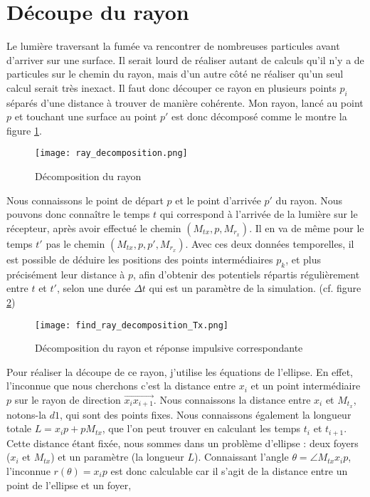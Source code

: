 \section{Découpe du rayon}

Le lumière traversant la fumée va rencontrer de nombreuses particules avant d'arriver sur une surface. Il serait lourd de réaliser autant de calculs qu'il n'y a de particules sur le chemin du rayon, mais d'un autre côté ne réaliser qu'un seul calcul serait très inexact. Il faut donc découper ce rayon en plusieurs points $p_i$ séparés d'une distance à trouver de manière cohérente. Mon rayon, lancé au point $p$ et touchant une surface au point $p'$ est donc décomposé comme le montre la figure \ref{fig:decomposition_rayon}.

\begin{figure}[h!]
\centering
\texttt{[image: ray\_decomposition.png]}
\caption{Décomposition du rayon}
\label{fig:decomposition_rayon}
\end{figure}

Nous connaissons le point de départ $p$ et le point d'arrivée $p'$ du rayon. Nous pouvons donc connaître le temps $t$ qui correspond à l'arrivée de la lumière sur le récepteur, après avoir effectué le chemin $(M_{tx}, p, M_{r_x})$. Il en va de même pour le temps $t'$ pas le chemin $(M_{tx}, p, p', M_{r_x})$. Avec ces deux données temporelles, il est possible de déduire les positions des points intermédiaires $p_k$, et plus précisément leur distance à $p$, afin d'obtenir des potentiels répartis régulièrement entre $t$ et $t'$, selon une durée $\Delta t$ qui est un paramètre de la simulation. (cf. figure \ref{fig:find_ray_decomposition})

\begin{figure}[h!]
\centering
\texttt{[image: find\_ray\_decomposition\_Tx.png]}
\caption{Décomposition du rayon et réponse impulsive correspondante}
\label{fig:find_ray_decomposition}
\end{figure}

Pour réaliser la découpe de ce rayon, j'utilise les équations de l'ellipse. En effet, l'inconnue que nous cherchons c'est la distance entre $x_i$ et un point intermédiaire $p$ sur le rayon de direction $\overrightarrow{x_i x_{i+1}}$. Nous connaissons la distance entre $x_i$ et $M_{t_x}$, notons-la $d1$, qui sont des points fixes. Nous connaissons également la longueur totale $L = x_i p + p M_{tx}$, que l'on peut trouver en calculant les temps $t_i$ et $t_{i+1}$. Cette distance étant fixée, nous sommes dans un problème d'ellipse : deux foyers ($x_i$ et $M_{tx}$) et un paramètre (la longueur $L$). Connaissant l'angle $\theta = \angle M_{tx} x_i p$, l'inconnue $r(\theta) = x_i p$ est donc calculable car il s'agit de la distance entre un point de l'ellipse et un foyer, 

